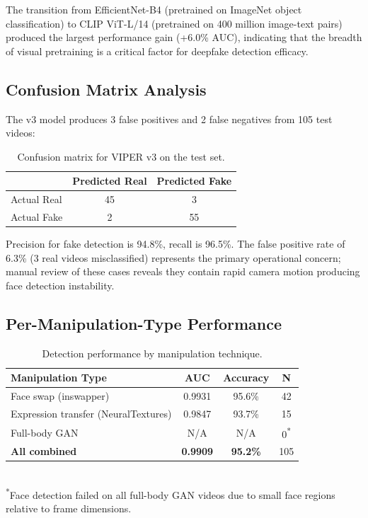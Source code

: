 \documentclass[11pt, twocolumn]{article}
\begin{document}
The transition from EfficientNet-B4 (pretrained on ImageNet object classification) to CLIP ViT-L/14 (pretrained on 400 million image-text pairs) produced the largest performance gain (+6.0\% AUC), indicating that the breadth of visual pretraining is a critical factor for deepfake detection efficacy.

\subsection{Confusion Matrix Analysis}

The v3 model produces 3 false positives and 2 false negatives from 105 test videos:

\begin{table}[H]
\centering
\caption{Confusion matrix for VIPER v3 on the test set.}
\small
\begin{tabular}{lcc}
\toprule
& Predicted Real & Predicted Fake \\
\midrule
Actual Real & 45 & 3 \\
Actual Fake & 2 & 55 \\
\bottomrule
\end{tabular}
\end{table}

Precision for fake detection is 94.8\%, recall is 96.5\%. The false positive rate of 6.3\% (3 real videos misclassified) represents the primary operational concern; manual review of these cases reveals they contain rapid camera motion producing face detection instability.

\subsection{Per-Manipulation-Type Performance}

\begin{table}[H]
\centering
\caption{Detection performance by manipulation technique.}
\small
\begin{tabular}{lccc}
\toprule
Manipulation Type & AUC & Accuracy & N \\
\midrule
Face swap (inswapper) & 0.9931 & 95.6\% & 42 \\
Expression transfer (NeuralTextures) & 0.9847 & 93.7\% & 15 \\
Full-body GAN & N/A & N/A & 0\textsuperscript{*} \\
\midrule
\textbf{All combined} & \textbf{0.9909} & \textbf{95.2\%} & 105 \\
\bottomrule
\end{tabular}
\\[4pt]
\footnotesize\textsuperscript{*}Face detection failed on all full-body GAN videos due to small face regions relative to frame dimensions.
\end{table}
\end{document}
